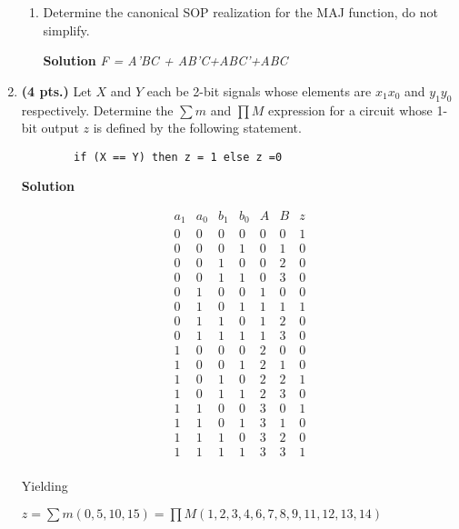 \begin{enumerate}
\begin{enumerate}
	\item Determine the canonical SOP realization for the MAJ
	function, do not simplify.

\begin{onlysolution}  \textbf{Solution} \itshape
 F = A'BC + AB'C+ABC'+ABC
\end{onlysolution}
\end{enumerate}

\item \textbf{ (4 pts.)} Let $X$ and $Y$ each be 2-bit signals whose 
elements are $x_1 x_0$ and $y_1 y_0$ respectively.  Determine the 
$\sum m$ and $\prod M$ expression for a circuit whose 1-bit 
output $z$ is defined by the following statement.
\begin{verbatim}
        if (X == Y) then z = 1 else z =0
\end{verbatim}

\begin{onlysolution}  \textbf{Solution} \itshape

$$\begin{array}{c|c|c|c||c|c||c}
a_1 & a_0 & b_1 & b_0 & A  & B & z  \\ \hline
0 & 0 & 0 & 0 & 0 & 0 & 1  \\ \hline
0 & 0 & 0 & 1 & 0 & 1 & 0  \\ \hline
0 & 0 & 1 & 0 & 0 & 2 & 0  \\ \hline
0 & 0 & 1 & 1 & 0 & 3 & 0  \\ \hline
0 & 1 & 0 & 0 & 1 & 0 & 0  \\ \hline
0 & 1 & 0 & 1 & 1 & 1 & 1  \\ \hline
0 & 1 & 1 & 0 & 1 & 2 & 0  \\ \hline
0 & 1 & 1 & 1 & 1 & 3 & 0  \\ \hline
1 & 0 & 0 & 0 & 2 & 0 & 0  \\ \hline
1 & 0 & 0 & 1 & 2 & 1 & 0  \\ \hline
1 & 0 & 1 & 0 & 2 & 2 & 1  \\ \hline
1 & 0 & 1 & 1 & 2 & 3 & 0  \\ \hline
1 & 1 & 0 & 0 & 3 & 0 & 1  \\ \hline
1 & 1 & 0 & 1 & 3 & 1 & 0  \\ \hline
1 & 1 & 1 & 0 & 3 & 2 & 0  \\ \hline
1 & 1 & 1 & 1 & 3 & 3 & 1  \\
\end{array}$$

Yielding

$z = \sum m(0,5,10,15) = \prod M(1,2,3,4,6,7,8,9,11,12,13,14)$
\end{onlysolution}



\end{enumerate}
